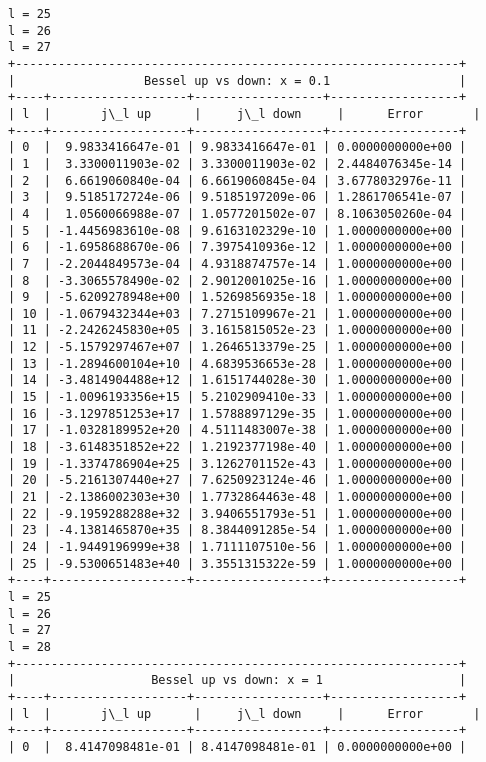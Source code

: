 \documentclass[9pt]{article}
\begin{document}
    \begin{Verbatim}[commandchars=\\\{\}]
l = 25
l = 26
l = 27
+--------------------------------------------------------------+
|                  Bessel up vs down: x = 0.1                  |
+----+-------------------+------------------+------------------+
| l  |       j\_l up      |     j\_l down     |      Error       |
+----+-------------------+------------------+------------------+
| 0  |  9.9833416647e-01 | 9.9833416647e-01 | 0.0000000000e+00 |
| 1  |  3.3300011903e-02 | 3.3300011903e-02 | 2.4484076345e-14 |
| 2  |  6.6619060840e-04 | 6.6619060845e-04 | 3.6778032976e-11 |
| 3  |  9.5185172724e-06 | 9.5185197209e-06 | 1.2861706541e-07 |
| 4  |  1.0560066988e-07 | 1.0577201502e-07 | 8.1063050260e-04 |
| 5  | -1.4456983610e-08 | 9.6163102329e-10 | 1.0000000000e+00 |
| 6  | -1.6958688670e-06 | 7.3975410936e-12 | 1.0000000000e+00 |
| 7  | -2.2044849573e-04 | 4.9318874757e-14 | 1.0000000000e+00 |
| 8  | -3.3065578490e-02 | 2.9012001025e-16 | 1.0000000000e+00 |
| 9  | -5.6209278948e+00 | 1.5269856935e-18 | 1.0000000000e+00 |
| 10 | -1.0679432344e+03 | 7.2715109967e-21 | 1.0000000000e+00 |
| 11 | -2.2426245830e+05 | 3.1615815052e-23 | 1.0000000000e+00 |
| 12 | -5.1579297467e+07 | 1.2646513379e-25 | 1.0000000000e+00 |
| 13 | -1.2894600104e+10 | 4.6839536653e-28 | 1.0000000000e+00 |
| 14 | -3.4814904488e+12 | 1.6151744028e-30 | 1.0000000000e+00 |
| 15 | -1.0096193356e+15 | 5.2102909410e-33 | 1.0000000000e+00 |
| 16 | -3.1297851253e+17 | 1.5788897129e-35 | 1.0000000000e+00 |
| 17 | -1.0328189952e+20 | 4.5111483007e-38 | 1.0000000000e+00 |
| 18 | -3.6148351852e+22 | 1.2192377198e-40 | 1.0000000000e+00 |
| 19 | -1.3374786904e+25 | 3.1262701152e-43 | 1.0000000000e+00 |
| 20 | -5.2161307440e+27 | 7.6250923124e-46 | 1.0000000000e+00 |
| 21 | -2.1386002303e+30 | 1.7732864463e-48 | 1.0000000000e+00 |
| 22 | -9.1959288288e+32 | 3.9406551793e-51 | 1.0000000000e+00 |
| 23 | -4.1381465870e+35 | 8.3844091285e-54 | 1.0000000000e+00 |
| 24 | -1.9449196999e+38 | 1.7111107510e-56 | 1.0000000000e+00 |
| 25 | -9.5300651483e+40 | 3.3551315322e-59 | 1.0000000000e+00 |
+----+-------------------+------------------+------------------+
l = 25
l = 26
l = 27
l = 28
+--------------------------------------------------------------+
|                   Bessel up vs down: x = 1                   |
+----+-------------------+------------------+------------------+
| l  |       j\_l up      |     j\_l down     |      Error       |
+----+-------------------+------------------+------------------+
| 0  |  8.4147098481e-01 | 8.4147098481e-01 | 0.0000000000e+00 |

\end{Verbatim}
\end{document}
